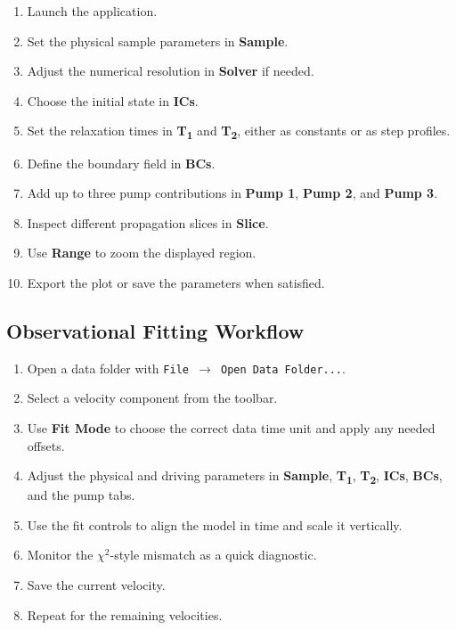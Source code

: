 \documentclass[12pt,a4paper]{article}
\newcommand{\tab}[1]{\textbf{#1}}
\newcommand{\menu}[1]{\texttt{#1}}
\begin{document}
\begin{enumerate}
  \item Launch the application.
  \item Set the physical sample parameters in \tab{Sample}.
  \item Adjust the numerical resolution in \tab{Solver} if needed.
  \item Choose the initial state in \tab{ICs}.
  \item Set the relaxation times in \tab{T\textsubscript{1}} and
        \tab{T\textsubscript{2}}, either as constants or as step profiles.
  \item Define the boundary field in \tab{BCs}.
  \item Add up to three pump contributions in \tab{Pump 1}, \tab{Pump 2},
        and \tab{Pump 3}.
  \item Inspect different propagation slices in \tab{Slice}.
  \item Use \tab{Range} to zoom the displayed region.
  \item Export the plot or save the parameters when satisfied.
\end{enumerate}

\subsection{Observational Fitting Workflow}

\begin{enumerate}
  \item Open a data folder with \menu{File $\to$ Open Data Folder...}.
  \item Select a velocity component from the toolbar.
  \item Use \tab{Fit Mode} to choose the correct data time unit and apply any needed offsets.
    \item Adjust the physical and driving parameters in \tab{Sample},
        \tab{T\textsubscript{1}}, \tab{T\textsubscript{2}}, \tab{ICs},
        \tab{BCs}, and the pump tabs.
  \item Use the fit controls to align the model in time and scale it vertically.
  \item Monitor the $\chi^2$-style mismatch as a quick diagnostic.
  \item Save the current velocity.
  \item Repeat for the remaining velocities.
\end{enumerate}

\end{document}
